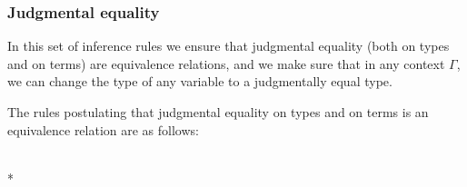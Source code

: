 \subsubsection*{Judgmental equality}

In this set of inference rules we ensure that judgmental equality (both on types and on terms) are equivalence relations, and we make sure that in any context $\Gamma$, we can change the type of any variable to a judgmentally equal type.

\begin{samepage}
The rules postulating that judgmental equality on types and on terms is an equivalence relation are as follows:
\begin{center}
\begin{minipage}{.2\textwidth}
\begin{prooftree}
\end{prooftree}
\end{minipage}
\begin{minipage}{.25\textwidth}
\begin{prooftree}
\end{prooftree}
\end{minipage}
\begin{minipage}{.5\textwidth}
\begin{prooftree}
\end{prooftree}
\end{minipage}
\\*
\bigskip
\begin{minipage}{.2\textwidth}
\begin{prooftree}
\end{prooftree}
\end{minipage}
\begin{minipage}{.25\textwidth}
\begin{prooftree}
\end{prooftree}
\end{minipage}
\begin{minipage}{.5\textwidth}
\begin{prooftree}
\end{prooftree}
\end{minipage}
\end{center}
\end{samepage}

